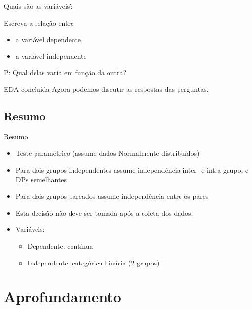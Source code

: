 \documentclass{beamer}
\begin{document}
\begin{frame}{Quais são as variáveis?}
  \begin{block}{}
    Escreva a relação entre
    \medskip
    \begin{itemize}
    \item a variável dependente
    \item a variável independente
    \end{itemize}
  \end{block}
  \bigskip
  \begin{block}{P:}
    Qual delas varia em função da outra?
  \end{block}
\end{frame}

\begin{frame}
  \begin{block}{EDA concluída}
    Agora podemos discutir as respostas das perguntas.
  \end{block}
\end{frame}


\subsection{Resumo}

\begin{frame}{Resumo}
  \begin{itemize}
    \small
  \item Teste paramétrico (assume dados Normalmente distribuídos)
  \item Para dois grupos independentes assume independência inter- e intra-grupo, e DPs semelhantes
  \item Para dois grupos pareados assume independência entre os pares
  \item Esta decisão \alert{não} deve ser tomada após a coleta dos dados.
  \item Variáveis:
    \begin{itemize}
    \item Dependente: contínua
    \item Independente: categórica binária (2 grupos)
    \end{itemize}
  \end{itemize}
\end{frame}

\section{Aprofundamento}
\end{document}
